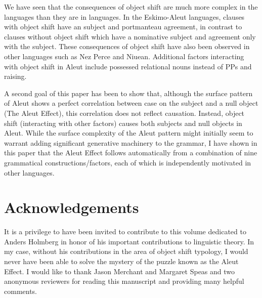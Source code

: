 \documentclass[output=paper]{LSP/langsci}
\begin{document}
We have seen that the consequences of object shift are much more complex in the  languages than they are in  languages. In the Eskimo-Aleut languages, clauses with object shift have an  subject and portmanteau agreement, in contrast to clauses without object shift which have a nominative subject and agreement only with the subject. These consequences of object shift have also been observed in other  languages such as Nez Perce and Niuean. Additional factors interacting with object shift in Aleut include possessed relational nouns instead of PPs and  raising.

A second goal of this paper has been to show that, although the surface pattern of Aleut shows a perfect correlation between  case on the subject and a null object (The Aleut Effect), this correlation does not reflect causation. Instead, object shift (interacting with other factors) causes both  subjects and null objects in Aleut. While the surface complexity of the Aleut pattern might initially seem to warrant adding significant generative machinery to the grammar, I have shown in this paper that the Aleut Effect follows automatically from a combination of nine grammatical constructions/factors, each of which is independently motivated in other languages.

\section*{Acknowledgements}
It is a privilege to have been invited to contribute to this volume dedicated to Anders Holmberg in honor of his important contributions to linguistic theory. In my case, without his contributions in the area of object shift typology, I would never have been able to solve the mystery of the puzzle known as the Aleut Effect.
I would like to thank Jason Merchant and Margaret Speas and two anonymous reviewers for reading this manuscript and providing many helpful comments.

\printbibliography[heading=subbibliography,notkeyword=this]
\end{document}
